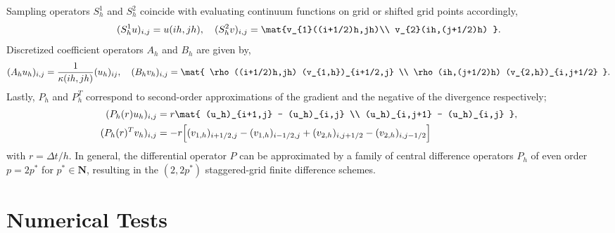 

Sampling operators $S_h^1$ and $S_h^2$ coincide with evaluating continuum functions on grid or shifted grid points accordingly,
\[
	(S_h^1 u)_{i,j} = u(ih,jh), \quad 
	(S_h^2 v)_{i,j} = \mat{v_{1}((i+1/2)h,jh)\\ 
				  v_{2}(ih,(j+1/2)h) }.
\]
Discretized coefficient operators $A_h$ and $B_h$ are given by,
\[
	(A_h u_h)_{i,j} = \frac{1}{\kappa(ih,jh)} (u_h)_{ij}, \quad
	(B_h v_h)_{i,j} = \mat{ \rho((i+1/2)h,jh) (v_{1,h})_{i+1/2,j} \\
					 \rho(ih,(j+1/2)h) (v_{2,h})_{i,j+1/2} }.
\]
Lastly, $P_h$ and $P_h^T$ correspond to second-order approximations of the gradient and the negative of the divergence respectively;
\begin{equation*}
\begin{split}
	(P_{h}(r) u_h)_{i,j} &= r \mat{ (u_h)_{i+1,j} - (u_h)_{i,j} \\
					     (u_h)_{i,j+1} - (u_h)_{i,j} }, \\
	(P_{h}(r)^T v_h)_{i,j} &= -r \Big[ (v_{1,h})_{i+1/2,j} - (v_{1,h})_{i-1/2,j} + (v_{2,h})_{i,j+1/2} - (v_{2,h})_{i,j-1/2} \Big]
\end{split}
\end{equation*}
with $r =  \Delta t/h$.
In general, the differential operator $P$ can be approximated by a family of central difference operators $P_h$ of even order $p=2p^*$ for $p^*\in\mathbf N$, resulting in the $(2,2p^*)$ staggered-grid finite difference schemes.


\newpage
\section{Numerical Tests}

